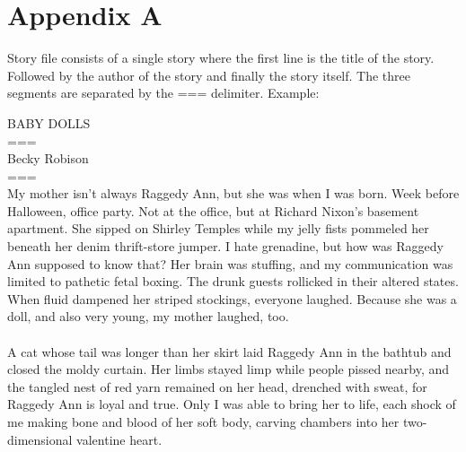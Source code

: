 \documentclass[11pt]{article}
\begin{document}
\section{Appendix A}
\label{appendix:a}
Story file consists of a single story where the first line is the title of the story. Followed by the author of the story and finally the story itself. The three segments are separated by the === delimiter. Example: 

\noindent BABY DOLLS\\
===\\
Becky Robison\\
===\\
My mother isn’t always Raggedy Ann, but she was when I was born. Week before Halloween, office party. Not at the office, but at Richard Nixon’s basement apartment. She sipped on Shirley Temples while my jelly fists pommeled her beneath her denim thrift-store jumper. I hate grenadine, but how was Raggedy Ann supposed to know that? Her brain was stuffing, and my communication was limited to pathetic fetal boxing. The drunk guests rollicked in their altered states. When fluid dampened her striped stockings, everyone laughed. Because she was a doll, and also very young, my mother laughed, too.\\
\\
A cat whose tail was longer than her skirt laid Raggedy Ann in the bathtub and closed the moldy curtain. Her limbs stayed limp while people pissed nearby, and the tangled nest of red yarn remained on her head, drenched with sweat, for Raggedy Ann is loyal and true. Only I was able to bring her to life, each shock of me making bone and blood of her soft body, carving chambers into her two-dimensional valentine heart.
\end{document}
